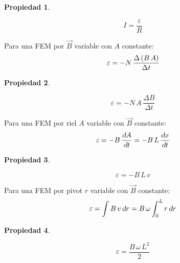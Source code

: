 \documentclass[a5paper,12pt,twoside]{book}
\newtheorem{prop}{{Propiedad}}[chapter]
\begin{document}
\begin{mdframed}[style=MyFrame1]
    \begin{prop}
    \end{prop}
    \begin{equation*}
        I = \frac{\varepsilon}{R}
    \end{equation*}
\end{mdframed}

Para una FEM por $\Vec{B}$ variable con $A$ constante:
\begin{equation*}
    \varepsilon = - N \, \frac{\Delta \left(B \, A\right)}{\Delta t}
\end{equation*}

\begin{mdframed}[style=MyFrame1]
    \begin{prop}
    \end{prop}
    \begin{equation*}
        \varepsilon = - N \, A \, \frac{\Delta B}{\Delta t}
    \end{equation*}
\end{mdframed}

Para una FEM por riel $A$ variable con $\Vec{B}$ constante:
\begin{equation*}
    \varepsilon = - B \, \frac{\textsl{d} A}{\textsl{d} t} = - B \, L \, \frac{\textsl{d} x}{\textsl{d} t}
\end{equation*}

\begin{mdframed}[style=MyFrame1]
    \begin{prop}
    \end{prop}
    \begin{equation*}
        \varepsilon = - B \, L \, v
    \end{equation*}
\end{mdframed}

Para una FEM por pivot $r$ variable con $\Vec{B}$ constante:
\begin{equation*}
    \varepsilon = \int B \, v \, \textsl{d} r = B \, \omega \int_0^L r \, \textsl{d} r
\end{equation*}

\begin{mdframed}[style=MyFrame1]
    \begin{prop}
    \end{prop}
    \begin{equation*}
        \varepsilon = \frac{B \, \omega \, L^2}{2}
    \end{equation*}
\end{mdframed}
\end{document}
